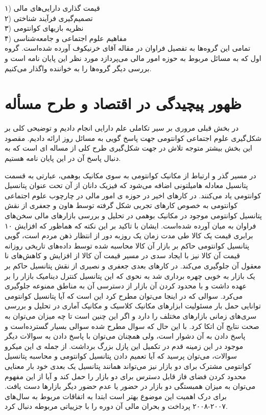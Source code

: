 \documentclass[a4paper,titlepage,12pt,fleqn,oneside]{report}
\begin{document}
	۱) قیمت گذاری دارایی‌های مالی\\
	۲) تصمیم‌گیری فرآیند شناختی\\
	۳) نظریه بازیهای کوانتومی\\
	۴) مفاهیم علوم اجتماعی و جامعه‌شناسی\\
	تمامی این گروه‌ها به تفصیل فراوان در مقاله آقای خرنیکوف\cite{kh1} آورده شده‌است. گروه اول که به مسائل مربوط به حوزه امور مالی می‌پردازد مورد نظر این پایان نامه است و بررسی دیگر گروه‌ها را به خواننده واگذار می‌کنیم.
	
	
	\section{ظهور پیچیدگی در اقتصاد و طرح مسأله}
	در بخش قبلی مروری بر سیر تکاملی علم دارایی انجام دادیم و توضیحی کلی بر شکل‌گیری علوم اجتماعی کوانتومی جهت پاسخ گویی به مسائل روز ارائه دادیم. مقصود این بخش بیشتر متوجه تلاش در جهت شکل‌گیری طرح کلی از مساله ای است که به دنبال پاسخ آن در این پایان نامه هستیم. 
	
	در مسیر گذر و ارتباط از مکانیک کوانتومی به سوی مکانیک بوهمی، عبارتی به قسمت پتانسیل معادله هامیلتونی اضافه می‌شود که فیزیک دانان از آن تحت عنوان پتانسیل کوانتومی یاد می‌کنند. 
	در کارهای اخیر در حوزه ی امور مالی در چارچوب علوم اجتماعی کوانتومی به خصوص کارهای تجربی شکل گرفته توسط هاون
	\cite{haven1} 
	و جعفری
	\cite{tahmaseb}
	از نقش پتانسیل کوانتومی موجود در مکانیک بوهمی در تحلیل و بررسی بازارهای مالی سخن‌های فراوان به میان آورده شده‌است. ایشان با تاکید بر این نکته که هماظور که افزایش ۱۰ برابری قیمت یک کالا طی مدت زمان یک روزبه دور از انتظار ذهن مردم است، گویی پتانسیل کوانتومی حاکم بر بازار آن کالا محاسبه شده توسط داده‌های تاریخی روزانه قیمت آن کالا نیز با ایجاد سدی در مسیر قیمت آن کالا از افزایش و کاهش‌های نا معقول آن جلوگیری می‌کند. در کارهای بعدی جعفری و نصیری از نقش پتانسیل حاکم بر یک بازار به خوبی چهره برداری شد به نحوی که این پتانسیل کنترل دینامیک بازار را بر عهده داشت و با محدود کردن آن بازار از دسترسی آن به مناطق ممنوعه جلوگیری می‌کرد\cite{nas1}\cite{nas2}. سوالی که در اینجا می‌توان مطرح کرد این است که آیا پتانسیل کوانتومی توانایی حمل بار مسئولیت ابزارهای مکانیک کلاسیک و مکانیک آماری در تحلیل و بررسی سری‌های زمانی بازارهای مختلف را دارد و اگر این چنین است تا چه میزان می‌توان به صحت نتایج آن اتکا کرد. با این حال که سوال مطرح شده سوالی بسیار گسترده‌است و پاسخ دادن به آن دشوار است، ولی همچنان می‌توان با پاسخ دادن به سوالات دیگر موجود در این زمینه قدم در تکمیل این پازل بزرگ برداشت. از جمله ی این میکرو سوالات، می‌توان پرسید که آیا تعمیم دادن پتانسیل کوانتومی و محاسبه پتانسیل کوانتومی مشترک برای دو بازار نیز می‌تواند همانند پتانسیل یک بعدی خود بار معنایی محدود کردن فضای فاز قابل دسترس برای دو بازار را حمل کند و آیا از این مفهوم می‌توان به میزان همبستگی دو بازار در حضور یا عدم حضور دیگر بازار‌ها دست یافت. برای درک اهمیت این موضوع بهتر است ابتدا به اتفاقات مربوط به سال‌های ۲۰۰۷-۲۰۰۸ پرداخت و بحران مالی آن دوره را با جزییاتی مربوطه دنبال کرد.\newline
	
\end{document}
